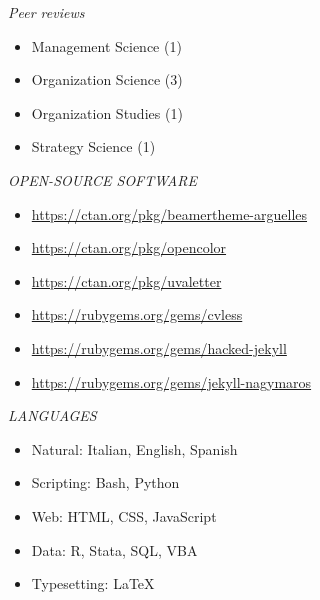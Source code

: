 \documentclass[11pt,a4paper]{article}
\newcommand\cvsection[1]{\bigskip\textit{\uppercase{\firamedium#1}}\hspace{.5em}\hrulefill\smallskip}
\newcommand\cvsubsection[1]{\medskip\textit{\mdseries #1}\smallskip}
\newenvironment{cvlines}{\begin{itemize}[nosep,leftmargin=1em]\firalight}{\end{itemize}}
\newcommand\cvline[4][,]{\item #2#1 #3\hfill{\firatabular#4}}
\begin{document}
\cvsubsection{Peer reviews}

\begin{cvlines}
    \cvline[]{Management Science}{(1)}{}
    \cvline[]{Organization Science}{(3)}{}
    \cvline[]{Organization Studies}{(1)}{}
    \cvline[]{Strategy Science}{(1)}{}
\end{cvlines}

\cvsection{Open-source software}

\begin{cvlines}
    \cvline[]{\url{https://ctan.org/pkg/beamertheme-arguelles}}{}{}
    \cvline[]{\url{https://ctan.org/pkg/opencolor}}{}{}
    \cvline[]{\url{https://ctan.org/pkg/uvaletter}}{}{}
    \cvline[]{\url{https://rubygems.org/gems/cvless}}{}{}
    \cvline[]{\url{https://rubygems.org/gems/hacked-jekyll}}{}{}
    \cvline[]{\url{https://rubygems.org/gems/jekyll-nagymaros}}{}{}
\end{cvlines}

\cvsection{Languages}

\begin{cvlines}
    \cvline[:]{Natural}{Italian, English, Spanish}{}
    \cvline[:]{Scripting}{Bash, Python}{}
    \cvline[:]{Web}{HTML, CSS, JavaScript}{}
    \cvline[:]{Data}{R, Stata, SQL, VBA}{}
    \cvline[:]{Typesetting}{LaTeX}{}
\end{cvlines}
\end{document}
